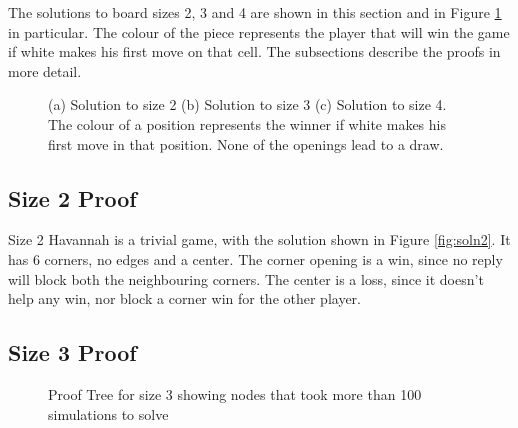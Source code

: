 The solutions to board sizes 2, 3 and 4 are shown in this section and in Figure \ref{fig:solutionboard} in particular. The colour of the piece represents the player that will win the game if white makes his first move on that cell. The subsections describe the proofs in more detail.

\begin{figure}[tb]
\centering
\caption{(a) Solution to size 2 (b) Solution to size 3 (c) Solution to size 4. The colour of a position represents the winner if white makes his first move in that position. None of the openings lead to a draw.}
\label{fig:solutionboard}
\end{figure}


\subsection{Size 2 Proof}

Size 2 Havannah is a trivial game, with the solution shown in Figure \ref{fig:soln2}. It has 6 corners, no edges and a center. The corner opening is a win, since no reply will block both the neighbouring corners. The center is a loss, since it doesn't help any win, nor block a corner win for the other player.

\subsection{Size 3 Proof}

\begin{figure}
\centering

\caption{Proof Tree for size 3 showing nodes that took more than 100 simulations to solve}
\label{fig:proof3}
\end{figure}

